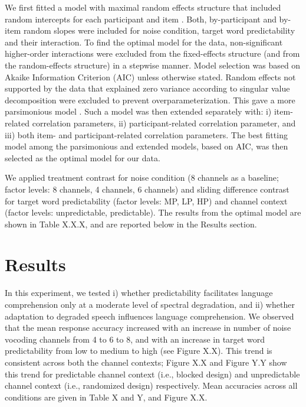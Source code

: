 \documentclass[a4paper, nobind]{templates/ociamthesis}
\begin{document}
We first fitted a model with maximal random effects structure that included random intercepts for each participant and item \autocite{Barr2013}.
Both, by-participant and by-item random slopes were included for noise condition, target word predictability and their interaction.
To find the optimal model for the data, non-significant higher-order interactions were excluded from the fixed-effects structure (and from the random-effects structure) in a stepwise manner.
Model selection was based on Akaike Information Criterion (AIC) \autocite{Grueber2011,Richards2011} unless otherwise stated.
Random effects not supported by the data that explained zero variance according to singular value decomposition were excluded to prevent overparameterization.
This gave a more parsimonious model \autocite{Bates2015a}.
Such a model was then extended separately with: i) item-related correlation parameters, ii) participant-related correlation parameter, and iii) both item- and participant-related correlation parameters.
The best fitting model among the parsimonious and extended models, based on AIC, was then selected as the optimal model for our data.

We applied treatment contrast for noise condition (8 channels as a baseline; factor levels: 8 channels, 4 channels, 6 channels) and sliding difference contrast for target word predictability (factor levels: MP, LP, HP) and channel context (factor levels: unpredictable, predictable).
The results from the optimal model are shown in Table X.X.X, and are reported below in the Results section.

\hypertarget{results}{%
\section{Results}\label{results}}

In this experiment, we tested i) whether predictability facilitates language comprehension only at a moderate level of spectral degradation, and ii) whether adaptation to degraded speech influences language comprehension.
We observed that the mean response accuracy increased with an increase in number of noise vocoding channels from 4 to 6 to 8, and with an increase in target word predictability from low to medium to high (see Figure X.X).
This trend is consistent across both the channel contexts; Figure X.X and Figure Y.Y show this trend for predictable channel context (i.e., blocked design) and unpredictable channel context (i.e., randomized design) respectively.
Mean accuracies across all conditions are given in Table X and Y, and Figure X.X.
\end{document}
